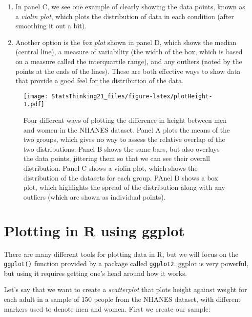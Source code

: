 \documentclass[]{book}
\newenvironment{Shaded}{\begin{snugshade}}{\end{snugshade}}
\newcommand{\KeywordTok}[1]{\textcolor[rgb]{0.13,0.29,0.53}{\textbf{#1}}}
\newcommand{\DecValTok}[1]{\textcolor[rgb]{0.00,0.00,0.81}{#1}}
\newcommand{\StringTok}[1]{\textcolor[rgb]{0.31,0.60,0.02}{#1}}
\newcommand{\CommentTok}[1]{\textcolor[rgb]{0.56,0.35,0.01}{\textit{#1}}}
\newcommand{\OperatorTok}[1]{\textcolor[rgb]{0.81,0.36,0.00}{\textbf{#1}}}
\newcommand{\NormalTok}[1]{#1}
\providecommand{\tightlist}{%
  \setlength{\itemsep}{0pt}\setlength{\parskip}{0pt}}
\theoremstyle{definition}
\theoremstyle{definition}
\theoremstyle{definition}
\theoremstyle{remark}
\begin{document}
\begin{enumerate}
\def\labelenumi{\arabic{enumi}.}
\setcounter{enumi}{2}
\tightlist
\item
  In panel C, we see one example of clearly showing the data points,
  known as a \emph{violin plot}, which plots the distribution of data in
  each condition (after smoothing it out a bit).\\
\item
  Another option is the \emph{box plot} shown in panel D, which shows
  the median (central line), a measure of variability (the width of the
  box, which is based on a measure called the interquartile range), and
  any outliers (noted by the points at the ends of the lines). These are
  both effective ways to show data that provide a good feel for the
  distribution of the data.
\end{enumerate}

\begin{figure}
\centering
\texttt{[image: StatsThinking21\_files/figure-latex/plotHeight-1.pdf]}
\caption{\label{fig:plotHeight}Four different ways of plotting the
difference in height between men and women in the NHANES dataset. Panel
A plots the means of the two groups, which gives no way to assess the
relative overlap of the two distributions. Panel B shows the same bars,
but also overlays the data points, jittering them so that we can see
their overall distribution. Panel C shows a violin plot, which shows the
distribution of the datasets for each group. PAnel D shows a box plot,
which highlights the spread of the distribution along with any outliers
(which are shown as individual points).}
\end{figure}

\section{Plotting in R using ggplot}\label{plotting-in-r-using-ggplot}

There are many different tools for plotting data in R, but we will focus
on the \texttt{ggplot()} function provided by a package called
\texttt{ggplot2}. ggplot is very powerful, but using it requires getting
one's head around how it works.

Let's say that we want to create a \emph{scatterplot} that plots height
against weight for each adult in a sample of 150 people from the NHANES
dataset, with different markers used to denote men and women. First we
create our sample:

\begin{Shaded}
\end{Shaded}
\end{document}
